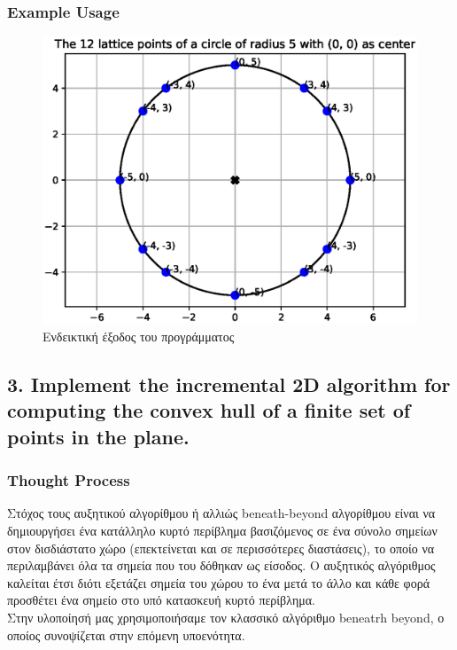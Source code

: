 \documentclass[12pt]{article}
\newenvironment{matlab}
	{\begin{figure}[H]\centering\captionsetup{justification=centering}}
	{\end{figure}}
\begin{document}
\subsubsection*{Example Usage}

\begin{matlab}
    \includegraphics[scale=1]{images/lattice_points.eps}
    \caption{Ενδεικτική έξοδος του προγράμματος}
\end{matlab}

\pagebreak

\subsection*{3. Implement the incremental 2D algorithm for computing the convex hull of a
finite set of points in the plane.}

\subsubsection*{Thought Process}

Στόχος τους αυξητικού αλγορίθμου ή αλλιώς beneath-beyond αλγορίθμου είναι να δημιουργήσει ένα κατάλληλο κυρτό περίβλημα βασιζόμενος σε ένα σύνολο σημείων στον δισδιάστατο χώρο (επεκτείνεται και σε περισσότερες διαστάσεις), το οποίο να περιλαμβάνει όλα τα σημεία που του δόθηκαν ως είσοδος. Ο αυξητικός αλγόριθμος καλείται έτσι διότι εξετάζει σημεία του χώρου το ένα μετά το άλλο και κάθε φορά προσθέτει ένα σημείο στο υπό κατασκευή κυρτό περίβλημα. \\

Στην υλοποίησή μας χρησιμοποιήσαμε τον κλασσικό αλγόριθμο beneatrh beyond, ο οποίος συνοψίζεται στην επόμενη υποενότητα. \\
\end{document}
